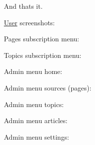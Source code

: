 And that\textquotesingle{}s it.

\mbox{\hyperlink{class_user}{User}} screenshots\+:

Pages subscription menu\+: 

 

Topics subscription menu\+: 

 

Admin menu home\+: 

 

Admin menu sources (pages)\+: 

 

Admin menu topics\+: 

 

Admin menu articles\+: 

 

Admin menu settings\+: 

 